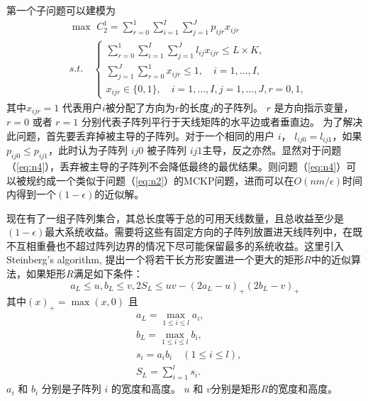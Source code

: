 第一个子问题可以建模为
\begin{equation}\label{eq:n4}
\begin{split}
&\max \,\, C_2^1 = \sum\limits_{r=0}^{1}\sum\limits_{i=1}^{I}\sum\limits_{j=1}^J p_{ijr} x_{ijr}\\
&s.t.\quad  \left\{\begin{array}{l}
\sum\limits_{r=0}^{1}\sum\limits_{i=1}^{I}\sum\limits_{j=1}^J l_{ij}x_{ijr}\leq L\times K,\\
\sum\limits_{j=1}^{J}\sum\limits_{r=0}^{1} x_{ijr}\leq 1,\quad i=1,\dots,I,\\
x_{ijr}\in\{0,1\}, \quad  i=1,\dots,I,j=1,\dots,J,r=0,1,\end{array}\right.
\end{split}
\end{equation}
其中$x_{ijr} = 1$ 代表用户$i$被分配了方向为$r$的长度$j$的子阵列。 $r$ 是方向指示变量， $r=0$ 或者 $r=1$ 分别代表子阵列平行于天线矩阵的水平边或者垂直边。
为了解决此问题，首先要丢弃掉被主导的子阵列。对于一个相同的用户 $i$， $l_{ij0}=l_{ij1}$，如果 $p_{ij0} \leq p_{ij1}$，此时认为子阵列 ${ij0}$ 被子阵列 ${ij1}$主导，反之亦然。显然对于问题（\ref{eq:n4}），丢弃被主导的子阵列不会降低最终的最优结果。则问题（\ref{eq:n4}）可以被规约成一个类似于问题（\ref{eq:n2}）的MCKP问题，进而可以在$O(nm/\epsilon)$时间内得到一个$(1-\epsilon)$的近似解。

现在有了一组子阵列集合，其总长度等于总的可用天线数量，且总收益至少是$(1-\epsilon)$最大系统收益。需要将这些有固定方向的子阵列放置进天线阵列中，在既不互相重叠也不超过阵列边界的情况下尽可能保留最多的系统收益。这里引入 Steinberg's algorithm\cite{steinberg1997strip}, 提出一个将若干长方形安置进一个更大的矩形$R$中的近似算法，如果矩形$R$满足如下条件：
\begin{equation}\label{eq:n5}
a_L \leq u, b_L \leq v, 2S_L \leq uv-(2a_L-u)_+(2b_L-v)_+
\end{equation}
其中$(x)_+ = \max(x,0)$ 且
\begin{equation}
\begin{split}
& a_L  = \max_{1\leq i\leq l}{a_i},\\
& b_L = \max_{1\leq i\leq l}{b_i},\\
& s_i = a_ib_i \quad (1\leq i\leq l),\\
& S_L = \sum_{i=1}^l{s_i}.
\end{split}
\end{equation}
$a_i$ 和 $b_i$ 分别是子阵列 $i$ 的宽度和高度。 $u$ 和 $v$分别是矩形$R$的宽度和高度。

